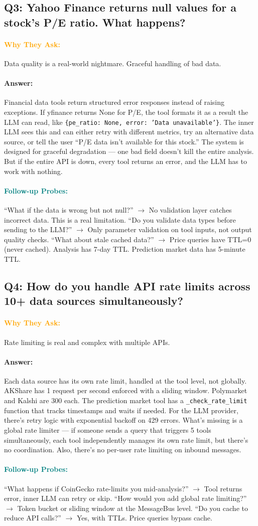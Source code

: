 \documentclass[11pt,a4paper]{article}
\newcommand{\Q}[1]{\subsection{#1}}
\newcommand{\Ans}[1]{\paragraph{\textbf{Answer:}} #1}
\newcommand{\Why}{\paragraph{\textcolor{orange}{\textbf{Why They Ask:}}}}
\newcommand{\Probe}{\paragraph{\textcolor{teal}{\textbf{Follow-up Probes:}}}}
\begin{document}
\Q{Q3: Yahoo Finance returns null values for a stock's P/E ratio. What happens?}
\Why Data quality is a real-world nightmare. Graceful handling of bad data.
\Ans Financial data tools return structured error responses instead of raising exceptions. If yfinance returns None for P/E, the tool formats it as a result the LLM can read, like \texttt{\{pe\_ratio: None, error: 'Data unavailable'\}}. The inner LLM sees this and can either retry with different metrics, try an alternative data source, or tell the user ``P/E data isn't available for this stock.'' The system is designed for graceful degradation --- one bad field doesn't kill the entire analysis. But if the entire API is down, every tool returns an error, and the LLM has to work with nothing.
\Probe ``What if the data is wrong but not null?'' $\rightarrow$ No validation layer catches incorrect data. This is a real limitation. ``Do you validate data types before sending to the LLM?'' $\rightarrow$ Only parameter validation on tool inputs, not output quality checks. ``What about stale cached data?'' $\rightarrow$ Price queries have TTL=0 (never cached). Analysis has 7-day TTL. Prediction market data has 5-minute TTL.

\Q{Q4: How do you handle API rate limits across 10+ data sources simultaneously?}
\Why Rate limiting is real and complex with multiple APIs.
\Ans Each data source has its own rate limit, handled at the tool level, not globally. AKShare has 1 request per second enforced with a sliding window. Polymarket and Kalshi are 300 each. The prediction market tool has a \texttt{\_check\_rate\_limit} function that tracks timestamps and waits if needed. For the LLM provider, there's retry logic with exponential backoff on 429 errors. What's missing is a global rate limiter --- if someone sends a query that triggers 5 tools simultaneously, each tool independently manages its own rate limit, but there's no coordination. Also, there's no per-user rate limiting on inbound messages.
\Probe ``What happens if CoinGecko rate-limits you mid-analysis?'' $\rightarrow$ Tool returns error, inner LLM can retry or skip. ``How would you add global rate limiting?'' $\rightarrow$ Token bucket or sliding window at the MessageBus level. ``Do you cache to reduce API calls?'' $\rightarrow$ Yes, with TTLs. Price queries bypass cache.
\end{document}
